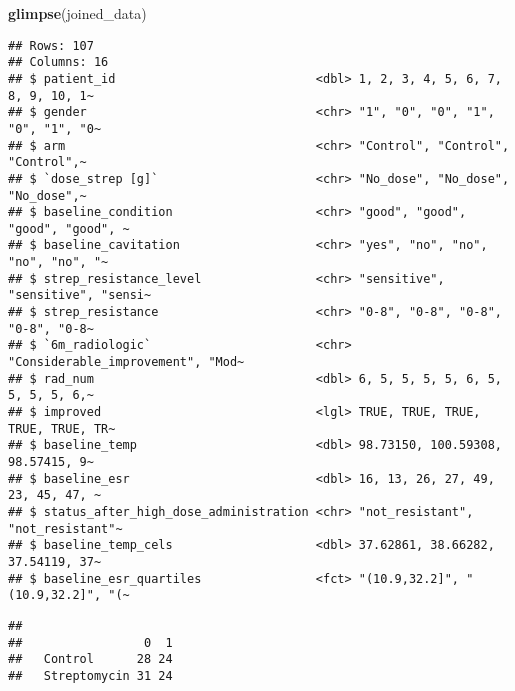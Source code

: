 \documentclass[
]{article}
\newenvironment{Shaded}{\begin{snugshade}}{\end{snugshade}}
\newcommand{\FunctionTok}[1]{\textcolor[rgb]{0.13,0.29,0.53}{\textbf{#1}}}
\newcommand{\NormalTok}[1]{#1}
\newcommand{\SpecialCharTok}[1]{\textcolor[rgb]{0.81,0.36,0.00}{\textbf{#1}}}
\begin{document}
\begin{Shaded}
\begin{Highlighting}[]
\FunctionTok{glimpse}\NormalTok{(joined\_data)}
\end{Highlighting}
\end{Shaded}

\begin{verbatim}
## Rows: 107
## Columns: 16
## $ patient_id                            <dbl> 1, 2, 3, 4, 5, 6, 7, 8, 9, 10, 1~
## $ gender                                <chr> "1", "0", "0", "1", "0", "1", "0~
## $ arm                                   <chr> "Control", "Control", "Control",~
## $ `dose_strep [g]`                      <chr> "No_dose", "No_dose", "No_dose",~
## $ baseline_condition                    <chr> "good", "good", "good", "good", ~
## $ baseline_cavitation                   <chr> "yes", "no", "no", "no", "no", "~
## $ strep_resistance_level                <chr> "sensitive", "sensitive", "sensi~
## $ strep_resistance                      <chr> "0-8", "0-8", "0-8", "0-8", "0-8~
## $ `6m_radiologic`                       <chr> "Considerable_improvement", "Mod~
## $ rad_num                               <dbl> 6, 5, 5, 5, 5, 6, 5, 5, 5, 5, 6,~
## $ improved                              <lgl> TRUE, TRUE, TRUE, TRUE, TRUE, TR~
## $ baseline_temp                         <dbl> 98.73150, 100.59308, 98.57415, 9~
## $ baseline_esr                          <dbl> 16, 13, 26, 27, 49, 23, 45, 47, ~
## $ status_after_high_dose_administration <chr> "not_resistant", "not_resistant"~
## $ baseline_temp_cels                    <dbl> 37.62861, 38.66282, 37.54119, 37~
## $ baseline_esr_quartiles                <fct> "(10.9,32.2]", "(10.9,32.2]", "(~
\end{verbatim}

\begin{Shaded}
\end{Shaded}

\begin{verbatim}
##               
##                 0  1
##   Control      28 24
##   Streptomycin 31 24
\end{verbatim}

\begin{Shaded}
\end{Shaded}
\end{document}
